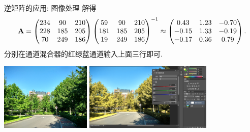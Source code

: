 \begin{frame}{逆矩阵的应用: 图像处理}
	\onslide<+->
	解得
	\[{\mathbf{A}}=\begin{pmatrix}
		234&90&210\\
		228&185&205\\
		70&249&186
	\end{pmatrix}\begin{pmatrix}
		59&90&210\\
		181&185&205\\
		19&249&186
	\end{pmatrix}^{-1}
	\approx\begin{pmatrix}
		0.43&1.23&-0.70\\
		-0.15&1.33&-0.19\\
		-0.17&0.36&0.79
	\end{pmatrix}.\]
	\onslide<+->
	分别在通道混合器的红绿蓝通道输入上面三行即可.
	\begin{center}
		\includegraphics[height=32mm]{../image/ps_in.jpg}
		\includegraphics[height=32mm]{../image/ps_out.png}
	\end{center}
\end{frame}



